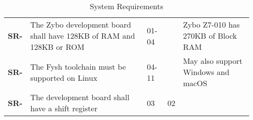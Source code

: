 \resetfyshcounter
\newcommand{\sr}[4]{
	\textbf{SR-\rc} & #1 & #2 & #3 & #4 \\
	\hline
}
\begin{table}[H]
	\begin{tabularx}{\textwidth}{| a | x | a | a | a |}
		\hline

		 &  %
		           &                           %
		           &                           %
		           &                           \\
		\hline
		\sr{The Zybo development board shall have 128KB of RAM and 128KB or ROM}%
		{01-04}%
		{}%
		{Zybo Z7-010 has 270KB of Block RAM} %

		\sr{The Fysh toolchain must be supported on Linux}%
		{04-11}%
		{}%
		{May also support Windows and macOS}

		\sr{The development board shall have a shift register}%
		{03}%
		{02}%
		{}
	\end{tabularx}
	\caption{System Requirements}
\end{table}

